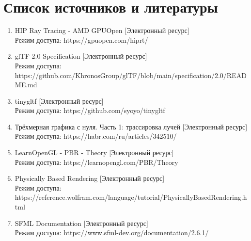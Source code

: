 \documentclass[a4paper,14pt]{extarticle}
\begin{document}
\begin{center}
\begin{longtable}{c c}
    \\
\end{longtable}

\end{center}

\newpage


\section{Список источников и литературы}
\begin{enumerate}
    \item HIP Ray Tracing - AMD GPUOpen [Электронный ресурс] \\Режим доступа: https://gpuopen.com/hiprt/
    \item glTF 2.0 Specification [Электронный ресурс] \\Режим доступа: https://github.com/KhronosGroup/glTF/blob/main/specification/2.0/README.md
    \item tinygltf [Электронный ресурс] \\Режим доступа: https://github.com/syoyo/tinygltf
    \item Трёхмерная графика с нуля. Часть 1: трассировка лучей [Электронный ресурс] \\Режим доступа: https://habr.com/ru/articles/342510/
    \item LearnOpenGL - PBR - Theory [Электронный ресурс] \\Режим доступа: https://learnopengl.com/PBR/Theory
    \item Physically Based Rendering [Электронный ресурс] \\Режим доступа: https://reference.wolfram.com/language/tutorial/PhysicallyBasedRendering.html
    \item SFML Documentation [Электронный ресурс] \\Режим доступа: https://www.sfml-dev.org/documentation/2.6.1/
\end{enumerate}
\end{document}
